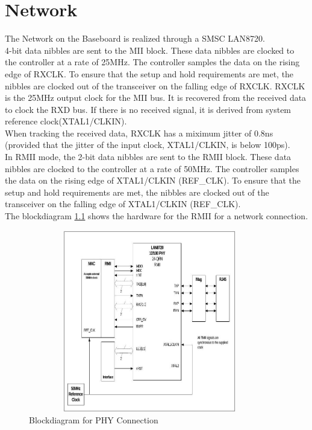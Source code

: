 \chapter{Network}
The Network on the Baseboard is realized through a SMSC LAN8720.\\
4-bit data nibbles are sent to the MII block. These data nibbles are clocked
to the controller at a rate of 25MHz. The controller samples the data on the
rising edge of RXCLK. To ensure that the setup and hold requirements are met,
the nibbles are clocked out of the transceiver on the falling edge of RXCLK.
RXCLK is the 25MHz output clock for the MII bus. It is recovered from the received
data to clock the RXD bus. If there is no received signal, it is derived from
system reference clock(XTAL1/CLKIN).\\
When tracking the received data, RXCLK has a miximum jitter of 0.8ns (provided
that the jitter of the input clock, XTAL1/CLKIN, is below 100ps).\\
In RMII mode, the 2-bit data nibbles are sent to the RMII block. These data nibbles
are clocked to the controller at a rate of 50MHz. The controller samples the data
on the rising edge of XTAL1/CLKIN (REF\_CLK). To ensure that the setup and hold
requirements are met, the nibbles are clocked out of the transceiver on the falling
edge of XTAL1/CLKIN (REF\_CLK).\\


The blockdiagram \ref{stm32f4_phy} shows the hardware for the RMII for
 a network connection.
\begin{figure}[ht]
	\centering
	\includegraphics[width=400px,height=300px]{../img/network.jpeg}
	\caption{Blockdiagram for PHY Connection}
	\label{stm32f4_phy}
\end{figure}

